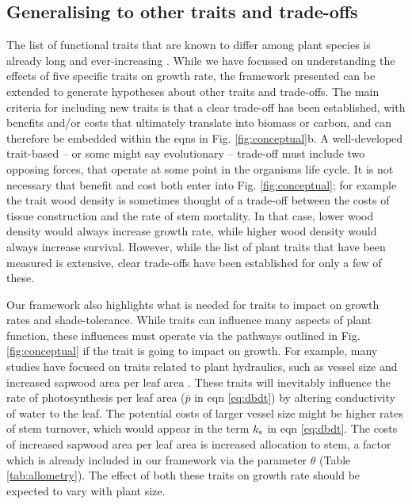 \documentclass[a4paper,11pt]{article}
\begin{document}
\subsection{Generalising to other traits and trade-offs}

The list of functional traits that are known to differ among plant species is already long and ever-increasing \citep{Perez-2013}. While we have focussed on understanding the effects of five specific traits on growth rate, the framework presented can be extended to generate hypotheses about other traits and trade-offs. The main criteria for including new traits is that a clear trade-off has been established, with benefits and/or costs that ultimately translate into biomass or carbon, and can therefore be embedded within the eqns in Fig. \ref{fig:conceptual}b. A well-developed trait-based -- or some might say evolutionary -- trade-off must include two opposing forces, that operate at some point in the organisms life cycle. It is not necessary that benefit and cost both enter into Fig. \ref{fig:conceptual}; for example the trait wood density is sometimes thought of a trade-off between the costs of tissue construction and the rate of stem mortality. In that case, lower wood density would always increase growth rate, while higher wood density would always increase survival.  However, while the list of plant traits that have been measured is extensive, clear trade-offs have been established for only a few of these.

Our framework also highlights what is needed for traits to impact on growth rates and shade-tolerance. While traits can influence many aspects of plant function, these  influences must operate via the pathways outlined in Fig. \ref{fig:conceptual} if the trait is going to impact on growth. For example, many studies have focused on traits related to plant hydraulics, such as vessel size and increased sapwood area per leaf area \citep{Zanne-2010}. These traits will inevitably influence the rate of photosynthesis per leaf area ($\bar{p}$ in eqn \ref{eq:dbdt}) by altering conductivity of water to the leaf. The potential costs of larger vessel size might be higher rates of stem turnover, which would appear in the term $k_{\rm s}$ in eqn \ref{eq:dbdt}. The costs of increased sapwood area per leaf area is increased allocation to stem, a factor which is already included in our framework via the parameter $\theta$ (Table \ref{tab:allometry}). The effect of both these traits on growth rate should be expected to vary with plant size.
\end{document}
